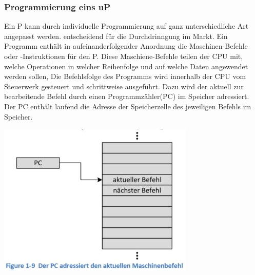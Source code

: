 \subsubsection{Programmierung eins uP}
\begin{multicols}{2}
\begin{minipage}{\linewidth}
    Ein \mu P kann durch individuelle Programmierung auf ganz unterschiedliche Art angepasst werden. \newline
    \rightarrow entscheidend für die Durchdrinngung im Markt.\newline
    Ein Programm enthält in aufeinanderfolgender Anordnung die Maschinen-Befehle oder -Instruktionen für den \mu P. Diese Maschiene-Befehle teilen der CPU mit, welche Operationen in welcher Reihenfolge und auf welche Daten angewendet werden sollen, \newline
    Die Befehlsfolge des Programms wird innerhalb der CPU vom Steuerwerk gesteuert und schrittweise ausgeführt. Dazu wird der aktuell zur bearbeitende Befehl durch einen Programmzähler(PC) im Speicher adressiert.\newline
    Der PC enthält laufend die Adresse der Speicherzelle des jeweiligen Befehls im Speicher.
\end{minipage}

\includegraphics[width=\linewidth]{images/uPPC}
\end{multicols}
    

